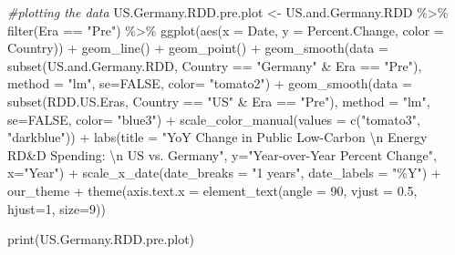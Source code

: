 \documentclass[
  12pt,
]{article}
\newenvironment{Shaded}{\begin{snugshade}}{\end{snugshade}}
\newcommand{\AttributeTok}[1]{\textcolor[rgb]{0.77,0.63,0.00}{#1}}
\newcommand{\CommentTok}[1]{\textcolor[rgb]{0.56,0.35,0.01}{\textit{#1}}}
\newcommand{\ConstantTok}[1]{\textcolor[rgb]{0.00,0.00,0.00}{#1}}
\newcommand{\DecValTok}[1]{\textcolor[rgb]{0.00,0.00,0.81}{#1}}
\newcommand{\FloatTok}[1]{\textcolor[rgb]{0.00,0.00,0.81}{#1}}
\newcommand{\FunctionTok}[1]{\textcolor[rgb]{0.00,0.00,0.00}{#1}}
\newcommand{\NormalTok}[1]{#1}
\newcommand{\OtherTok}[1]{\textcolor[rgb]{0.56,0.35,0.01}{#1}}
\newcommand{\SpecialCharTok}[1]{\textcolor[rgb]{0.00,0.00,0.00}{#1}}
\newcommand{\StringTok}[1]{\textcolor[rgb]{0.31,0.60,0.02}{#1}}
\begin{document}
\begin{Shaded}
\begin{Highlighting}[]
\CommentTok{\#plotting the data}
\NormalTok{US.Germany.RDD.pre.plot }\OtherTok{\textless{}{-}}\NormalTok{ US.and.Germany.RDD }\SpecialCharTok{\%\textgreater{}\%}
  \FunctionTok{filter}\NormalTok{(Era }\SpecialCharTok{==} \StringTok{"Pre"}\NormalTok{) }\SpecialCharTok{\%\textgreater{}\%}
  \FunctionTok{ggplot}\NormalTok{(}\FunctionTok{aes}\NormalTok{(}\AttributeTok{x =}\NormalTok{ Date,}
             \AttributeTok{y =}\NormalTok{ Percent.Change, }
             \AttributeTok{color =}\NormalTok{ Country)) }\SpecialCharTok{+} 
  \FunctionTok{geom\_line}\NormalTok{() }\SpecialCharTok{+}
  \FunctionTok{geom\_point}\NormalTok{() }\SpecialCharTok{+}
  \FunctionTok{geom\_smooth}\NormalTok{(}\AttributeTok{data =} \FunctionTok{subset}\NormalTok{(US.and.Germany.RDD, Country }\SpecialCharTok{==} \StringTok{"Germany"} \SpecialCharTok{\&}\NormalTok{ Era }\SpecialCharTok{==} \StringTok{"Pre"}\NormalTok{), }\AttributeTok{method =} \StringTok{"lm"}\NormalTok{, }\AttributeTok{se=}\ConstantTok{FALSE}\NormalTok{, }\AttributeTok{color=} \StringTok{"tomato2"}\NormalTok{) }\SpecialCharTok{+}
  \FunctionTok{geom\_smooth}\NormalTok{(}\AttributeTok{data =} \FunctionTok{subset}\NormalTok{(RDD.US.Eras, Country }\SpecialCharTok{==} \StringTok{"US"} \SpecialCharTok{\&}\NormalTok{ Era }\SpecialCharTok{==} \StringTok{"Pre"}\NormalTok{), }\AttributeTok{method =} \StringTok{"lm"}\NormalTok{, }\AttributeTok{se=}\ConstantTok{FALSE}\NormalTok{, }\AttributeTok{color=} \StringTok{"blue3"}\NormalTok{) }\SpecialCharTok{+}
  \FunctionTok{scale\_color\_manual}\NormalTok{(}\AttributeTok{values =} \FunctionTok{c}\NormalTok{(}\StringTok{"tomato3"}\NormalTok{, }\StringTok{"darkblue"}\NormalTok{)) }\SpecialCharTok{+}
  \FunctionTok{labs}\NormalTok{(}\AttributeTok{title =} \StringTok{"YoY Change in Public Low{-}Carbon }\SpecialCharTok{\textbackslash{}n}\StringTok{ Energy RD\&D Spending: }\SpecialCharTok{\textbackslash{}n}\StringTok{ US vs. Germany"}\NormalTok{,}
       \AttributeTok{y=}\StringTok{"Year{-}over{-}Year Percent Change"}\NormalTok{,}
       \AttributeTok{x=}\StringTok{"Year"}\NormalTok{) }\SpecialCharTok{+} 
  \FunctionTok{scale\_x\_date}\NormalTok{(}\AttributeTok{date\_breaks =} \StringTok{"1 years"}\NormalTok{, }\AttributeTok{date\_labels =} \StringTok{"\%Y"}\NormalTok{) }\SpecialCharTok{+}
\NormalTok{  our\_theme }\SpecialCharTok{+}
  \FunctionTok{theme}\NormalTok{(}\AttributeTok{axis.text.x =} \FunctionTok{element\_text}\NormalTok{(}\AttributeTok{angle =} \DecValTok{90}\NormalTok{, }\AttributeTok{vjust =} \FloatTok{0.5}\NormalTok{, }\AttributeTok{hjust=}\DecValTok{1}\NormalTok{, }\AttributeTok{size=}\DecValTok{9}\NormalTok{))}
  
\FunctionTok{print}\NormalTok{(US.Germany.RDD.pre.plot)}
\end{Highlighting}
\end{Shaded}
\end{document}
